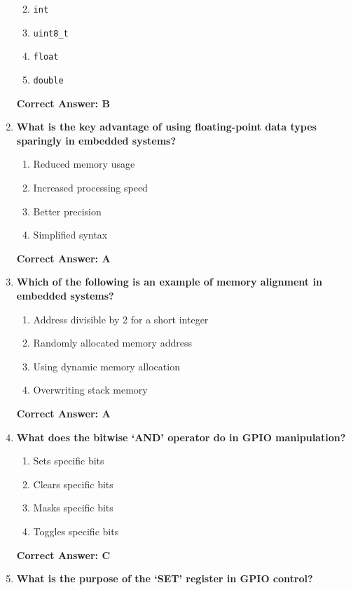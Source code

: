 \documentclass[
  9pt,
  letterpaper,
  abstract,
  titlepage]{scrbook}
\begin{document}
\begin{enumerate}
  \begin{enumerate}
  \def\labelenumii{\arabic{enumii}.}
  \item
    \texttt{int}
  \item
    \texttt{uint8\_t}
  \item
    \texttt{float}
  \item
    \texttt{double}
  \end{enumerate}

  \textbf{Correct Answer: B}
\item
  \textbf{What is the key advantage of using floating-point data types
  sparingly in embedded systems?}

  \begin{enumerate}
  \def\labelenumii{\arabic{enumii}.}
  \item
    Reduced memory usage
  \item
    Increased processing speed
  \item
    Better precision
  \item
    Simplified syntax
  \end{enumerate}

  \textbf{Correct Answer: A}
\item
  \textbf{Which of the following is an example of memory alignment in
  embedded systems?}

  \begin{enumerate}
  \def\labelenumii{\arabic{enumii}.}
  \item
    Address divisible by 2 for a short integer
  \item
    Randomly allocated memory address
  \item
    Using dynamic memory allocation
  \item
    Overwriting stack memory
  \end{enumerate}

  \textbf{Correct Answer: A}
\item
  \textbf{What does the bitwise `AND' operator do in GPIO manipulation?}

  \begin{enumerate}
  \def\labelenumii{\arabic{enumii}.}
  \item
    Sets specific bits
  \item
    Clears specific bits
  \item
    Masks specific bits
  \item
    Toggles specific bits
  \end{enumerate}

  \textbf{Correct Answer: C}
\item
  \textbf{What is the purpose of the `SET' register in GPIO control?}


\end{enumerate}
\end{document}
